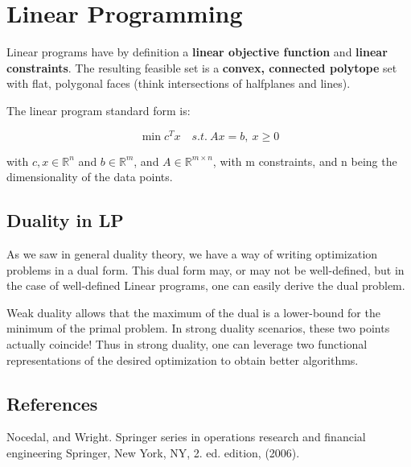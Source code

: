 \documentclass[class=article, crop=false]{standalone}
\begin{document}
\section{Linear Programming}
	Linear programs have by definition a \textbf{linear objective function} and \textbf{linear constraints}. The resulting feasible set is a \textbf{convex, connected polytope} set with flat, polygonal faces (think intersections of halfplanes and lines).

	The linear program standard form is:

		$$\min c^Tx \quad s.t.\ Ax = b,\ x\ge0$$

	with $c, x \in \mathbb{R}^n$ and $b \in \mathbb{R}^m$, and $A \in \mathbb{R}^{m \times n}$, with m constraints, and n being the dimensionality of the data points. 

	\subsection{Duality in LP}

		As we saw in general duality theory, we have a way of writing optimization problems in a dual form. This dual form may, or may not be well-defined, but in the case of well-defined Linear programs, one can easily derive the dual problem.

		Weak duality allows that the maximum of the dual is a lower-bound for the minimum of the primal problem. In strong duality scenarios, these two points actually coincide! Thus in strong duality, one can leverage two functional representations of the desired optimization to obtain better algorithms.

	\subsection{References}
		Nocedal, and Wright. Springer series in operations research and financial engineering Springer, New York, NY, 2. ed. edition, (2006).
\end{document}
